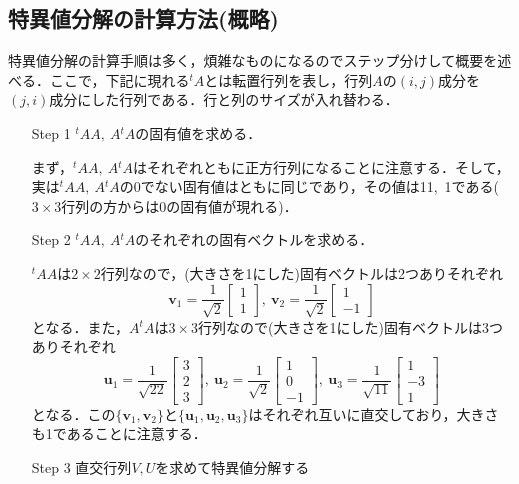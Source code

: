 \documentclass[a4paper,12pt,autodetect-engine,dvipdfmx]{jsarticle}
\theoremstyle{definition}
\begin{document}
\subsection{特異値分解の計算方法(概略)}
特異値分解の計算手順は多く，煩雑なものになるのでステップ分けして概要を述べる．ここで，下記に現れる$^{t}A$とは転置行列を表し，行列$A$の$(i,j)$成分を$(j,i)$成分にした行列である．行と列のサイズが入れ替わる．
\begin{enumerate}
    \item[Step 1] $^{t}AA,\ A {^{t}A}$の固有値を求める．
    
    まず，$^{t}AA,\ A {^{t}A}$はそれぞれともに正方行列になることに注意する．そして，実は$^{t}AA,\ A {^{t}A}$の0でない固有値はともに同じであり，その値は11,\ 1である($3\times 3$行列の方からは0の固有値が現れる)．
    \item[Step 2] $^{t}AA,\ A {^{t}A}$のそれぞれの固有ベクトルを求める．
    
    $^{t}AA$は$2\times 2$行列なので，(大きさを1にした)固有ベクトルは2つありそれぞれ
    \begin{equation*}
        \bm{v}_{1}=
        \dfrac{1}{\sqrt{2}}
        \begin{bmatrix}
            1\\
            1
        \end{bmatrix},\ 
        \bm{v}_{2}=
        \dfrac{1}{\sqrt{2}}
        \begin{bmatrix}
            1\\
            -1
        \end{bmatrix}
    \end{equation*}
    となる．また，$A{^{t}}A$は$3\times 3$行列なので(大きさを1にした)固有ベクトルは3つありそれぞれ
    \begin{equation*}
        \bm{u}_{1}=
        \dfrac{1}{\sqrt{22}}
        \begin{bmatrix}
            3\\
            2\\
            3
        \end{bmatrix},\ 
        \bm{u}_{2}=
        \dfrac{1}{\sqrt{2}}
        \begin{bmatrix}
            1\\
            0\\
            -1
        \end{bmatrix},\ 
        \bm{u}_{3}=
        \dfrac{1}{\sqrt{11}}
        \begin{bmatrix}
            1\\
            -3\\
            1
        \end{bmatrix}
    \end{equation*}
    となる．この$\{\bm{v}_{1},\bm{v}_{2}\}$と$\{\bm{u}_{1},\bm{u}_{2},\bm{u}_{3}\}$はそれぞれ互いに直交しており，大きさも1であることに注意する．
    \item[Step 3] 直交行列$V,U$を求めて特異値分解する
    

\end{enumerate}
\end{document}
